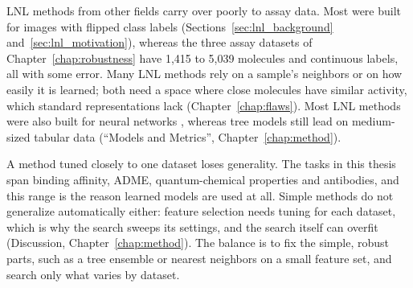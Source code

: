 LNL methods from other fields carry over poorly to assay data. Most were built for images with flipped class labels \citep{Song2022} (Sections~\ref{sec:lnl_background} and~\ref{sec:lnl_motivation}), whereas the three assay datasets of Chapter~\ref{chap:robustness} have 1,415 to 5,039 molecules and continuous labels, all with some error. Many LNL methods rely on a sample's neighbors or on how easily it is learned; both need a space where close molecules have similar activity, which standard representations lack (Chapter~\ref{chap:flaws}). Most LNL methods were also built for neural networks \citep{Song2022}, whereas tree models still lead on medium-sized tabular data \citep{Grinsztajn2022} (``Models and Metrics'', Chapter~\ref{chap:method}).

A method tuned closely to one dataset loses generality. The tasks in this thesis span binding affinity, ADME, quantum-chemical properties and antibodies, and this range is the reason learned models are used at all. Simple methods do not generalize automatically either: feature selection needs tuning for each dataset, which is why the search sweeps its settings, and the search itself can overfit (Discussion, Chapter~\ref{chap:method}). The balance is to fix the simple, robust parts, such as a tree ensemble or nearest neighbors on a small feature set, and search only what varies by dataset.



